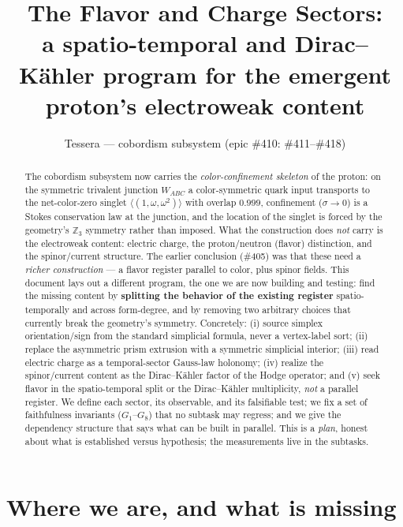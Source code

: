 \documentclass[11pt]{article}
\title{\bfseries The Flavor and Charge Sectors:\\
a spatio-temporal and Dirac--K\"ahler program for the emergent proton's
electroweak content}
\author{Tessera --- cobordism subsystem (epic \#410: \#411--\#418)}
\date{}
\theoremstyle{definition}
\newcommand{\Z}{\mathbb{Z}}
\newcommand{\sigmacol}{\sigma}
\begin{document}
\maketitle

\begin{abstract}
The cobordism subsystem now carries the \emph{color-confinement skeleton} of the
proton: on the symmetric trivalent junction $W_{ABC}$ a color-symmetric quark input
transports to the net-color-zero singlet $\langle(1,\omega,\omega^2)\rangle$ with
overlap $0.999$, confinement ($\sigmacol\to0$) is a Stokes conservation law at the
junction, and the location of the singlet is forced by the geometry's $\Z_3$ symmetry
rather than imposed. What the construction does \emph{not} carry is the electroweak
content: electric charge, the proton/neutron (flavor) distinction, and the
spinor/current structure. The earlier conclusion (\#405) was that these need a
\emph{richer construction} --- a flavor register parallel to color, plus spinor
fields. This document lays out a different program, the one we are now building and
testing: find the missing content by \textbf{splitting the behavior of the existing
register} spatio-temporally and across form-degree, and by removing two arbitrary
choices that currently break the geometry's symmetry. Concretely: (i) source simplex
orientation/sign from the standard simplicial formula, never a vertex-label sort; (ii)
replace the asymmetric prism extrusion with a symmetric simplicial interior; (iii) read
electric charge as a temporal-sector Gauss-law holonomy; (iv) realize the spinor/current
content as the Dirac--K\"ahler factor of the Hodge operator; and (v) seek flavor in the
spatio-temporal split or the Dirac--K\"ahler multiplicity, \emph{not} a parallel
register. We define each sector, its observable, and its falsifiable test; we fix a set
of faithfulness invariants ($G_1$--$G_8$) that no subtask may regress; and we give the
dependency structure that says what can be built in parallel. This is a \emph{plan},
honest about what is established versus hypothesis; the measurements live in the
subtasks.
\end{abstract}

\tableofcontents

\section{Where we are, and what is missing}
\label{sec:where}
\end{document}
